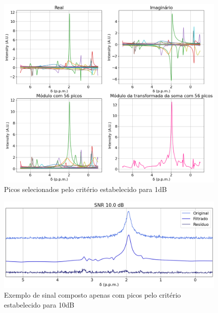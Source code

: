\documentclass[12pt]{article}
\begin{document}
\begin{figure} [H]
    \centering
    \includegraphics[scale=0.5]{real-imag-modulo-1.png}
    \caption{Picos selecionados pelo critério estabelecido para 1dB}
    \label{fig:12}
\end{figure}

\begin{figure} [H]
    \centering
    \includegraphics[scale=0.5]{original-filtrado-residuo-10.png}
    \caption{Exemplo de sinal composto apenas com picos pelo critério estabelecido para 10dB}
    \label{fig:13}
\end{figure}
\end{document}
